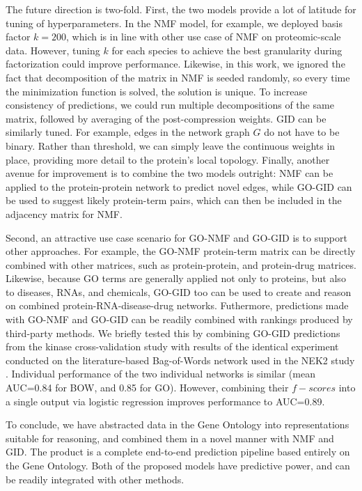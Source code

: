 \documentclass[12pt,a4paper]{report}
\begin{document}
{{The future direction is two-fold. First, the two models provide a lot of latitude for tuning of hyperparameters. In the NMF model, for example, we deployed basis factor $k=200$, which is in line with other use case of NMF on proteomic-scale data.  However, tuning $k$ for each species to achieve the best granularity during factorization could improve performance. Likewise, in this work, we ignored the fact that decomposition of the matrix in NMF is seeded randomly, so every time the minimization function is solved, the solution is unique. To increase consistency of predictions, we could run multiple decompositions of the same matrix, followed by averaging of the post-compression weights. GID can be similarly tuned. For example, edges in the network graph $G$ do not have to be binary. Rather than threshold, we can simply leave the continuous weights in place, providing more detail to the protein's local topology. Finally, another avenue for improvement is to combine the two models outright: NMF can be applied to the protein-protein network to predict novel edges, while GO-GID can be used to suggest likely protein-term pairs, which can then be included in the adjacency matrix for NMF.

Second, an attractive use case scenario for GO-NMF and GO-GID is to support other approaches. For example, the GO-NMF protein-term matrix can be directly combined with other matrices, such as protein-protein, and protein-drug matrices. Likewise, because GO terms are generally applied not only to proteins, but also to diseases, RNAs, and chemicals, GO-GID too can be used to create and reason on combined protein-RNA-disease-drug networks. Futhermore, predictions made with  GO-NMF and GO-GID can be readily combined with rankings produced by third-party methods. We briefly tested this by combining GO-GID predictions from the kinase cross-validation study with results of the identical experiment conducted on the literature-based Bag-of-Words network used in the NEK2 study \cite{NEK2}. Individual performance of the two individual networks is similar (mean AUC=0.84 for BOW, and 0.85 for GO). However, combining their $f-scores$ into a single output via logistic regression improves performance to AUC=0.89.

To conclude, we have abstracted data in the Gene Ontology into representations suitable for reasoning, and combined them in a novel manner with NMF and GID. The product is a complete end-to-end prediction pipeline based entirely on the Gene Ontology. Both of the proposed models have predictive power, and can be readily integrated with other methods.

}}
\end{document}
